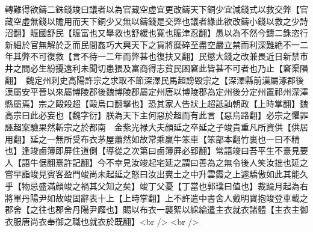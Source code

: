 轉難得欲鑄二銖錢竣曰議者以為官藏空虛宜更改鑄天下銅少宜減錢式以救交弊【官藏空虛無錢以贍用而天下銅少又無以鑄錢是交弊也議者緣此欲改鑄小錢以救之少詩沼翻】賑國舒民【賑富也又舉救也舒緩也寛也賑津忍翻】愚以為不然今鑄二銖恣行新細於官無解於乏而民間姦巧大興天下之貨將糜碎至盡空嚴立禁而利深難絶不一二年其弊不可復救【言不待一二年而弊甚也復扶又翻】民懲大錢之改兼畏近日新禁市井之間必生紛擾遠利未聞切患猥及富商得志貧民困窘此皆甚不可者也乃止【窘渠隕翻】　魏定州刺史高陽許宗之求取不節深澤民馬超謗毁宗之【深澤縣前漢屬涿郡後漢屬安平晉以來屬博陵郡後魏博陵郡屬定州唐以博陵郡為定州後分定州置祁州深澤縣屬焉】宗之毆殺超【毆烏口翻擊也】恐其家人告狀上超詆訕朝政【上時掌翻】魏高宗曰此必妄也【魏字衍】朕為天下主何惡於超而有此言【惡烏路翻】必宗之懼罪誣超案驗果然斬宗之於都南　金紫光禄大夫顔延之卒延之子竣貴重凡所資供【供居用翻】延之一無所受布衣茅屋蕭然如故常乘羸牛笨車【笨部本翻竹裏也一曰不精也】逢竣鹵簿即屏住道側【導從之次第曰鹵簿屛必郢翻】常語竣曰吾平生不憙見要人【語牛倨翻憙許記翻】今不幸見汝竣起宅延之謂曰善為之無令後人笑汝拙也延之嘗早詣竣見賓客盈門竣尚未起延之怒曰汝出糞土之中升雲霞之上遽驕傲如此其能久乎【物忌盛滿顔竣之禍其父知之矣】竣丁父憂【丁當也郭璞曰值也】裁踰月起為右將軍丹陽尹如故竣固辭表十上【上時掌翻】上不許遣中書舍人戴明寶抱竣登車載之郡舍【之往也郡舍丹陽尹廨也】賜以布衣一襲絮以綵綸遣主衣就衣諸體【主衣主御衣服唐尚衣奉御之職也就衣於既翻】<br />
<br />
